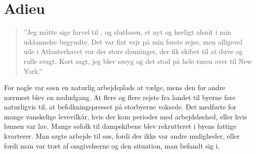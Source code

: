 \chapter{Adieu}\label{adieu}

\begin{quote}
    ''Jeg måtte sige farvel til , og slutfasen, et nyt og
herligt afsnit i min uddannelse begyndte. Det var fint vejr på min
første rejse, men alligevel ude i Atlanterhavet var der store dønninger,
der fik skibet til at duve og rulle svagt. Kort sagt, jeg blev søsyg og
det stod på hele turen over til New York.''
\end{quote}

For nogle var søen en naturlig arbejdsplads at vælge, mens den for andre
nærmest blev en nødudgang. At flere og flere rejste fra landet til byerne
føre naturligvis til, at befolkningspresset på storbyerne voksede. Det
medførte for mange vanskelige levevilkår, hvis der kom perioder med
arbejdsløshed, eller hvis lønnen var lav. Mange søfolk til dampskibene
blev rekrutteret i byens fattige kvarterer. Man søgte arbejde til søs,
fordi der ikke var andre muligheder, eller fordi man var træt af
omgivelserne og den situation, man befandt sig i. 

